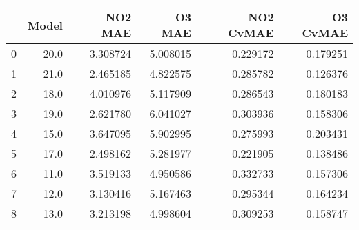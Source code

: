 \begin{tabular}{lrrrrr}
\toprule
{} &  Model &   NO2 MAE &    O3 MAE &  NO2 CvMAE &  O3 CvMAE \\
\midrule
0 &   20.0 &  3.308724 &  5.008015 &   0.229172 &  0.179251 \\
1 &   21.0 &  2.465185 &  4.822575 &   0.285782 &  0.126376 \\
2 &   18.0 &  4.010976 &  5.117909 &   0.286543 &  0.180183 \\
3 &   19.0 &  2.621780 &  6.041027 &   0.303936 &  0.158306 \\
4 &   15.0 &  3.647095 &  5.902995 &   0.275993 &  0.203431 \\
5 &   17.0 &  2.498162 &  5.281977 &   0.221905 &  0.138486 \\
6 &   11.0 &  3.519133 &  4.950586 &   0.332733 &  0.157306 \\
7 &   12.0 &  3.130416 &  5.167463 &   0.295344 &  0.164234 \\
8 &   13.0 &  3.213198 &  4.998604 &   0.309253 &  0.158747 \\
\bottomrule
\end{tabular}
